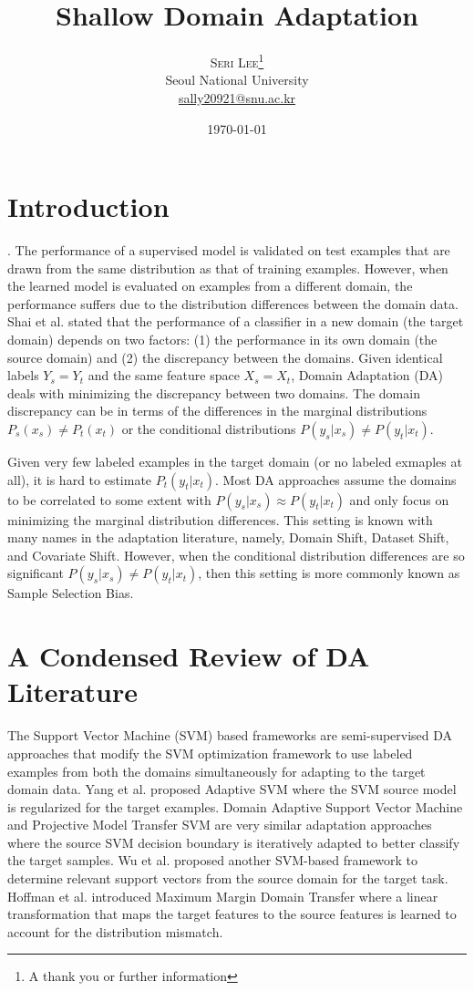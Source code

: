 \documentclass[twoside,twocolumn]{article}
\title{Shallow Domain Adaptation} %
\author{%
\textsc{Seri Lee}\thanks{A thank you or further information} \\[1ex] %
\normalsize Seoul National University \\ %
\normalsize \href{mailto:sally20921@snu.ac.kr}{sally20921@snu.ac.kr} %
}
\date{\today} %
\begin{document}
\maketitle


\section{Introduction}
\cite{b1}. The performance of a supervised model is validated on test examples that are drawn from the same distribution as that of training examples.
However, when the learned model is evaluated on examples from a different domain, the performance suffers due to the distribution differences between the domain data.
Shai et al. stated that the performance of a classifier in a new domain (the target domain) depends on two factors: (1) the performance in its own domain (the source domain)
and (2) the discrepancy between the domains.
Given identical labels $Y_s = Y_t$ and the same feature space $X_s = X_t$, Domain Adaptation (DA) deals with minimizing the discrepancy between two domains.
The domain discrepancy can be in terms of the differences in the marginal distributions $P_s(x_s) \neq P_t(x_t)$ or the conditional distributions $P(y_s | x_s) \neq P(y_t | x_t)$.

Given very few labeled examples in the target domain (or no labeled exmaples at all), it is hard to estimate $P_t(y_t|x_t)$. 
Most DA approaches assume the domains to be correlated to some extent with $P(y_s | x_s) \approx P(y_t | x_t)$ and only focus on minimizing the marginal distribution differences.
This setting is known with many names in the adaptation literature, namely, Domain Shift, Dataset Shift, and Covariate Shift.
However, when the conditional distribution differences are so significant $P(y_s|x_s) \neq P(y_t | x_t)$, then this setting is more commonly known as Sample Selection Bias.

\section{A Condensed Review of DA Literature}
The Support Vector Machine (SVM) based frameworks are semi-supervised DA approaches that modify the SVM optimization framework to use labeled examples from both the domains simultaneously for adapting to the target domain data.
Yang et al. proposed Adaptive SVM where the SVM source model is regularized for the target examples. Domain Adaptive Support Vector Machine and Projective Model Transfer SVM are very similar adaptation approaches where the source SVM decision boundary is iteratively adapted to better classify the target samples.
Wu et al. proposed another SVM-based framework to determine relevant support vectors from the source domain for the target task.
Hoffman et al. introduced Maximum Margin Domain Transfer where a linear transformation that maps the target features to the source features is learned to account for the distribution mismatch.
\end{document}
